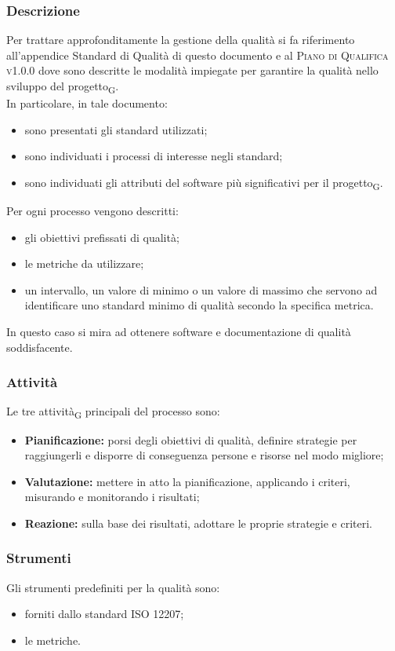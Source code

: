    \subsubsection{Descrizione}
    Per trattare approfonditamente la gestione della qualità si fa riferimento all'appendice Standard di Qualità di questo documento e al \textsc{Piano di Qualifica v1.0.0} dove sono descritte le modalità impiegate per garantire la qualità nello sviluppo del progetto\textsubscript{G}.\\In particolare, in tale documento:
    \begin{itemize}
    	\item sono presentati gli standard utilizzati;
    	\item sono individuati i processi di interesse negli standard;
    	\item sono individuati gli attributi del software più significativi per il progetto\textsubscript{G}.
    \end{itemize}
	Per ogni processo vengono descritti:
	\begin{itemize}
		\item gli obiettivi prefissati di qualità;
		\item le metriche da utilizzare;
		\item un intervallo, un valore di minimo o un valore di massimo che servono ad identificare uno standard minimo di qualità secondo la specifica metrica.
	\end{itemize}
	In questo caso si mira ad ottenere software e documentazione di qualità soddisfacente.
    \subsubsection{Attività}
    Le tre attività\textsubscript{G} principali del processo sono:
    \begin{itemize}
    	\item \textbf{Pianificazione:} porsi degli obiettivi di qualità, definire strategie per raggiungerli e disporre di conseguenza persone e risorse nel modo migliore;
    	\item \textbf{Valutazione:} mettere in atto la pianificazione, applicando i criteri, misurando e monitorando i risultati;
    	\item \textbf{Reazione:} sulla base dei risultati, adottare le proprie strategie e criteri.
    \end{itemize}
	\subsubsection{Strumenti}
	Gli strumenti predefiniti per la qualità sono:
	\begin{itemize}
		\item forniti dallo standard ISO 12207;
		\item le metriche.
	\end{itemize}
